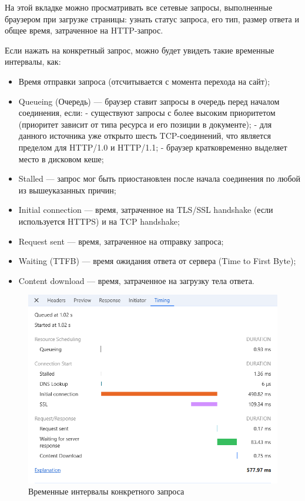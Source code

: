 \documentclass[12pt]{article}
\begin{document}
На этой вкладке можно просматривать все сетевые запросы, выполненные браузером при загрузке страницы:
узнать статус запроса, его тип, размер ответа и общее время, затраченное на HTTP-запрос.

Если нажать на конкретный запрос, можно будет увидеть такие временные интервалы, как:

\begin{itemize}[label=-]
    \item Время отправки запроса (отсчитывается с момента перехода на сайт);
    \item Queueing (Очередь) — браузер ставит запросы в очередь перед началом соединения, если:
          - существуют запросы с более высоким приоритетом (приоритет зависит от типа ресурса и его позиции в документе);
          - для данного источника уже открыто шесть TCP-соединений, что является пределом для HTTP/1.0 и HTTP/1.1;
          - браузер кратковременно выделяет место в дисковом кеше;
    \item Stalled — запрос мог быть приостановлен после начала соединения по любой из вышеуказанных причин;
    \item Initial connection — время, затраченное на TLS/SSL handshake (если используется HTTPS) и на TCP handshake;
    \item Request sent — время, затраченное на отправку запроса;
    \item Waiting (TTFB) — время ожидания ответа от сервера (Time to First Byte);
    \item Content download — время, затраченное на загрузку тела ответа.
\end{itemize}

\begin{figure}[H]
    \centering
    \includegraphics[width=1\textwidth]{../images/network__timing.png}
    \caption{Временные интервалы конкретного запроса}
\end{figure}
\end{document}
